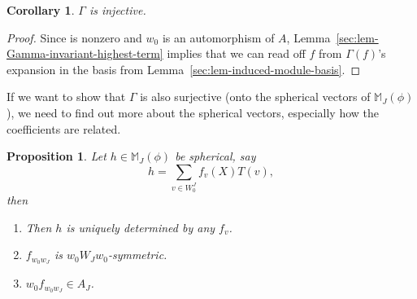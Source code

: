 \documentclass[10pt,a4paper]{amsart}
\newtheorem{Proposition}[Theorem]{Proposition}
\newtheorem{Corollary}[Theorem]{Corollary}
\theoremstyle{definition}
\numberwithin{equation}{section}
\begin{document}
\begin{Corollary}\label{sec:cor-Gamma-injective}
 $\Gamma$ is injective.
\end{Corollary}
\begin{proof}
 Since  is nonzero and
 $w_0$ is an automorphism of $A$, Lemma~\ref{sec:lem-Gamma-invariant-highest-term} implies that we can read off $f$ from $\Gamma(f)$'s
 expansion in the basis from Lemma~\ref{sec:lem-induced-module-basis}.
\end{proof}

If we want to show that $\Gamma$ is also surjective (onto the spherical
vectors of $\mathbb{M}_J(\phi)$), we need to find out more about the
spherical vectors, especially how the coefficients are related.

\begin{Proposition}\label{sec:prop-Gamma-properties}
 Let $h\in\mathbb{M}_J(\phi)$ be spherical, say
 \[
 h = \sum_{v\in W_0^J} f_v(X) T(v),
 \]
 then
 \begin{enumerate}\itemsep=0pt
 \item[$(i)$] Then $h$ is uniquely determined by any $f_v$.
 \item[$(ii)$] $f_{w_0w_J}$ is $w_0 W_J w_0$-symmetric.
 \item[$(iii)$] $w_0 f_{w_0 w_J}\in A_J$.
 \end{enumerate}
\end{Proposition}
\end{document}
